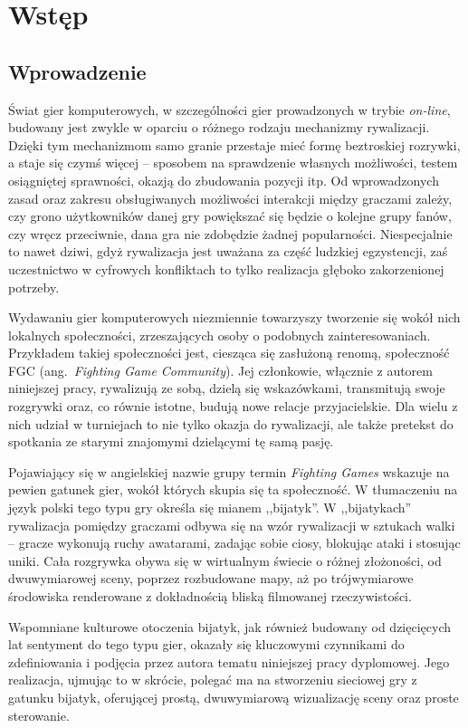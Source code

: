 \chapter{Wstęp}
\section{Wprowadzenie}
Świat gier komputerowych, w szczególności gier prowadzonych w trybie \emph{on-line}, budowany jest zwykle w oparciu o różnego rodzaju mechanizmy rywalizacji. Dzięki tym mechanizmom samo granie przestaje mieć formę beztroskiej rozrywki, a staje się czymś więcej -- sposobem na sprawdzenie własnych możliwości, testem osiągniętej sprawności, okazją do zbudowania pozycji itp. Od wprowadzonych zasad oraz zakresu obsługiwanych możliwości interakcji między graczami zależy, czy grono użytkowników danej gry powiększać się będzie o kolejne grupy fanów, czy wręcz przeciwnie, dana gra nie zdobędzie żadnej popularności. Niespecjalnie to nawet dziwi, gdyż rywalizacja jest uważana za część ludzkiej egzystencji, zaś uczestnictwo w cyfrowych konfliktach to tylko realizacja głęboko zakorzenionej potrzeby.

Wydawaniu gier komputerowych niezmiennie towarzyszy tworzenie się wokół nich lokalnych społeczności, zrzeszających osoby o podobnych zainteresowaniach. Przykładem takiej społeczności jest, ciesząca się zasłużoną renomą, społeczność FGC (ang.~\emph{Fighting Game Community}). Jej członkowie, włącznie z autorem niniejszej pracy, rywalizują ze sobą, dzielą się wskazówkami, transmitują swoje rozgrywki oraz, co równie istotne, budują nowe relacje przyjacielskie. Dla wielu z nich udział w turniejach to nie tylko okazja do rywalizacji, ale także pretekst do spotkania ze starymi znajomymi dzielącymi tę samą pasję.

Pojawiający się w angielskiej nazwie grupy termin \emph{Fighting Games} wskazuje na pewien gatunek gier, wokół których skupia się ta społeczność. W tłumaczeniu na język polski tego typu gry określa się mianem ,,bijatyk''. W  ,,bijatykach'' rywalizacja pomiędzy graczami odbywa się na wzór rywalizacji w sztukach walki -- gracze wykonują ruchy awatarami, zadając sobie ciosy, blokując ataki i stosując uniki. Cała rozgrywka obywa się w wirtualnym świecie o różnej złożoności, od dwuwymiarowej sceny, poprzez rozbudowane mapy, aż po trójwymiarowe środowiska renderowane z dokładnością bliską filmowanej rzeczywistości.

Wspomniane kulturowe otoczenia bijatyk, jak również budowany od dzięcięcych lat sentyment do tego typu gier, okazały się kluczowymi czynnikami do zdefiniowania i podjęcia przez autora tematu niniejszej pracy dyplomowej. Jego realizacja, ujmując to w skrócie, polegać ma na stworzeniu sieciowej gry z gatunku bijatyk, oferującej prostą, dwuwymiarową wizualizację sceny oraz proste sterowanie.

